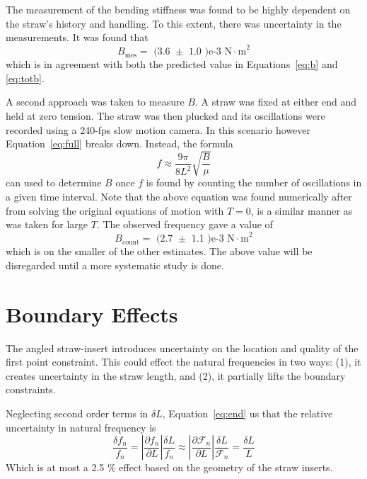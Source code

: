 \documentclass[twoside]{article}
\begin{document}
\begin{multicols}{2}
The measurement of the bending stiffness was found to be highly dependent on the straw's history and handling. To this extent, there was uncertainty in the measurements. It was found that
\begin{equation}
	B_\text{mes} = \text{  (3.6 $\pm$ 1.0 )e-3  N$\cdot$m}^2
\end{equation}
which is in agreement with both the predicted value in Equations~\ref{eq:b} and \ref{eq:totb}. 

A second approach was taken to measure $B$.  A straw was fixed at either end and held at zero tension. The straw was then plucked and its oscillations were recorded using a 240-fps slow motion camera.   In this scenario however Equation~\ref{eq:full} breaks down. Instead, the formula
\begin{equation}
	f \approx \frac{9 \pi}{8 L^2}\sqrt{\frac{B}{\mu}}
\end{equation}
can used to determine $B$ once $f$ is found by counting the number of oscillations in a given time interval.
 Note that the above equation was found numerically after from solving the original equations of motion with $T=0$, is a similar manner as was taken for large $T$.  The observed frequency gave a value of 
 \begin{equation}
 B_\text{count} = \text{  (2.7 $\pm$ 1.1 )e-3  N$\cdot$m}^2
 \end{equation}
which is on the smaller of the other estimates. The above value will be disregarded until a more systematic study is done.




\section{Boundary Effects}
\label{sec:boun}
The angled straw-insert introduces uncertainty on the location and quality of the first point constraint.  This could effect the natural frequencies in two ways: (1), it creates uncertainty in the straw length, and (2), it partially lifts the boundary constraints.

Neglecting second order terms in $\delta L$, Equation~\ref{eq:end} us that the relative uncertainty in natural frequency is
\begin{equation}
\frac{\delta f_n}{f_n} =|\frac{\partial f_n}{\partial L}| \frac{\delta L}{f_n} \approx |\frac{\partial \mathcal{F}_n}{\partial L}|\frac{\delta L}{\mathcal{F}_n} = \frac{\delta L}{L}
\end{equation} 
Which is at most a 2.5 \% effect based on the geometry of the straw inserts.


\end{multicols}
\end{document}
